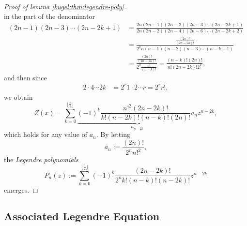 \begin{proof}[Proof of lemma \ref{kugel:thm:legendre-poly}]
\begin{equation*}
  \end{equation*}
  in the part of the denominator
  \begin{align*}
    (2n-1)(2n-3) \cdots (2n-2k+1) &= \frac{
        2n(2n-1)(2n-2)(2n-3) \cdots (2n-2k+1)
      }{
        2n(2n-2)(2n-4)(2n-6) \cdots (2n-2k+2)
      }
      \\
      &= \frac{
        \frac{(2n)!}{(2n-2k)!}
      }{
        2^k n(n-1)(n-2)(n-3) \cdots (n-k+1)
      }
      \\
      &= \frac{
        \frac{(2n)!}{(2n-2k)!}
      }{
        2^k \frac{n!}{(n-k)!}
      }
      = \frac{(n-k)!(2n)!}{n!(2n-2k)!2^k},
  \end{align*}
  and then since
  \begin{align*}
    2 \cdot 4  \cdots 2k &= 2^r 1\cdot2 \cdots r = 2^r r!,
  \end{align*}
  we obtain
  \begin{equation*}
    Z(x) = \sum_{k=0}^{\lfloor \frac{n}{2} \rfloor}
      \underbrace{
        (-1)^k \frac{n!^2(2n-2k)!}{k!(n-2k)!(n-k)!(2n)!} a_n
      }_{a_{n-2k}} z^{n-2k},
  \end{equation*}
  which holds for any value of $a_n$. By letting
  \begin{equation*}
    a_{n} := \frac{(2n)!}{2^n n!^2},
  \end{equation*}
  the \emph{Legendre polynomials}
  \begin{equation}
    P_n(z) := \sum_{k=0}^{\lfloor \frac{n}{2} \rfloor}
      (-1)^k \frac{(2n-2k)!}{2^n k! (n-k)!(n-2k)!} z^{n-2k} 
  \end{equation}
  emerges.
\end{proof}

\subsection{Associated Legendre Equation}
\label{kugel:sec:proofs:associated-legendre}

